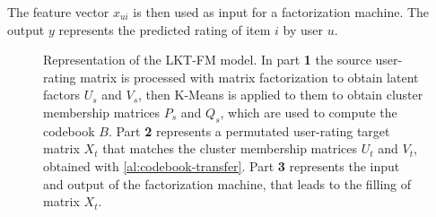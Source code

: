 The feature vector $x_{ui}$ is then used as input for a factorization machine. The output $y$ represents the predicted rating of item $i$ by user $u$.
\begin{figure}[hbt]
\caption{Representation of the LKT-FM model. In part \textbf{1} the source user-rating matrix is processed with matrix factorization to obtain latent factors $U_s$ and $V_s$, then K-Means is applied to them to obtain cluster membership matrices $P_s$ and $Q_s$, which are used to compute the codebook $B$. Part \textbf{2} represents a permutated user-rating target matrix $X_t$ that matches the cluster membership matrices $U_t$ and $V_t$, obtained with \autoref{al:codebook-transfer}. Part \textbf{3} represents the input and output of the factorization machine, that leads to the filling of matrix $X_t$. \cite{10.1007/978-3-319-71246-8_39}}
\label{fg:lkt-fm}
\end{figure}
